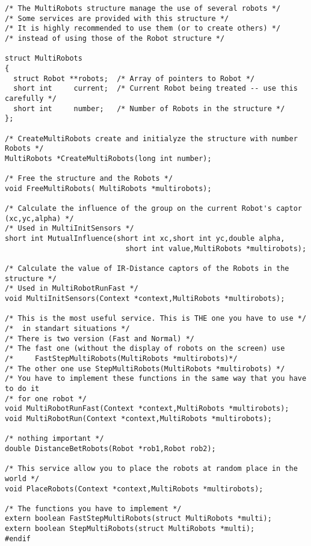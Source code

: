 \documentclass[a4paper,twoside]{article}
\begin{document}
{\begin{verbatim}
/* The MultiRobots structure manage the use of several robots */
/* Some services are provided with this structure */
/* It is highly recommended to use them (or to create others) */
/* instead of using those of the Robot structure */

struct MultiRobots
{
  struct Robot **robots;  /* Array of pointers to Robot */
  short int     current;  /* Current Robot being treated -- use this carefully */
  short int     number;   /* Number of Robots in the structure */
};

/* CreateMultiRobots create and initialyze the structure with number Robots */
MultiRobots *CreateMultiRobots(long int number);

/* Free the structure and the Robots */
void FreeMultiRobots( MultiRobots *multirobots);

/* Calculate the influence of the group on the current Robot's captor (xc,yc,alpha) */
/* Used in MultiInitSensors */ 
short int MutualInfluence(short int xc,short int yc,double alpha,
                            short int value,MultiRobots *multirobots);

/* Calculate the value of IR-Distance captors of the Robots in the structure */
/* Used in MultiRobotRunFast */
void MultiInitSensors(Context *context,MultiRobots *multirobots);

/* This is the most useful service. This is THE one you have to use */
/*  in standart situations */
/* There is two version (Fast and Normal) */
/* The fast one (without the display of robots on the screen) use 
/*     FastStepMultiRobots(MultiRobots *multirobots)*/
/* The other one use StepMultiRobots(MultiRobots *multirobots) */
/* You have to implement these functions in the same way that you have to do it
/* for one robot */ 
void MultiRobotRunFast(Context *context,MultiRobots *multirobots);
void MultiRobotRun(Context *context,MultiRobots *multirobots);

/* nothing important */
double DistanceBetRobots(Robot *rob1,Robot rob2);

/* This service allow you to place the robots at random place in the world */
void PlaceRobots(Context *context,MultiRobots *multirobots);

/* The functions you have to implement */
extern boolean FastStepMultiRobots(struct MultiRobots *multi);
extern boolean StepMultiRobots(struct MultiRobots *multi);
#endif
\end{verbatim}}

\newpage
\end{document}
